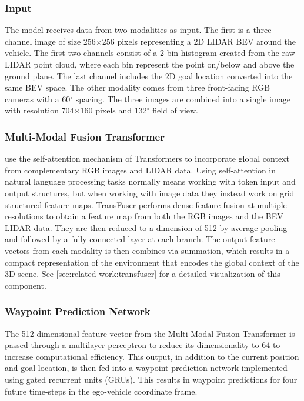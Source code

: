 \subsubsection{Input}
The model receives data from two modalities as input. The first is a three-channel image of size 256$\times$256 pixels representing a 2D LIDAR BEV around the vehicle. The first two channels consist of a 2-bin histogram created from the raw LIDAR point cloud, where each bin represent the point on/below and above the ground plane. The last channel includes the 2D goal location converted into the same BEV space. The other modality comes from three front-facing RGB cameras with a 60$^\circ$ spacing. The three images are combined into a single image with resolution 704$\times$160 pixels and 132$^\circ$ field of view.

\subsubsection{Multi-Modal Fusion Transformer}
\textcite{transfuser-pami} use the self-attention mechanism of Transformers to incorporate global context from complementary RGB images and LIDAR data. Using self-attention in natural language processing tasks normally means working with token input and output structures, but when working with image data they instead work on grid structured feature maps. TransFuser performs dense feature fusion at multiple resolutions to obtain a feature map from both the RGB images and the BEV LIDAR data. They are then reduced to a dimension of 512 by average pooling and followed by a fully-connected layer at each branch. The output feature vectors from each modality is then combines via summation, which results in a compact representation of the environment that encodes the global context of the 3D scene. See \cref{sec:related-work:transfuser} for a detailed visualization of this component.

\subsubsection{Waypoint Prediction Network}
The 512-dimensional feature vector from the Multi-Modal Fusion Transformer is passed through a multilayer perceptron to reduce its dimensionality to 64 to increase computational efficiency. This output, in addition to the current position and goal location, is then fed into a waypoint prediction network implemented using gated recurrent units (GRUs). This results in waypoint predictions for four future time-steps in the ego-vehicle coordinate frame.

